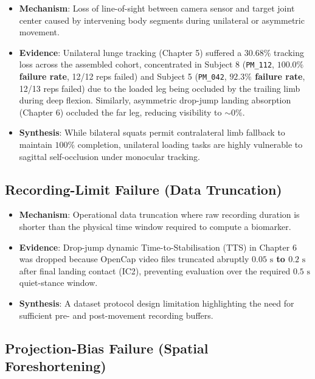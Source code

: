 \begin{itemize}
  \item \textbf{Mechanism}: Loss of line-of-sight between camera sensor and target joint center caused by intervening body segments during unilateral or asymmetric movement.
  \item \textbf{Evidence}: Unilateral lunge tracking (Chapter 5) suffered a $30.68\%$ tracking loss across the assembled cohort, concentrated in Subject 8 (\texttt{PM\_112}, \textbf{$100.0\%$ failure rate}, 12/12 reps failed) and Subject 5 (\texttt{PM\_042}, \textbf{$92.3\%$ failure rate}, 12/13 reps failed) due to the loaded leg being occluded by the trailing limb during deep flexion. Similarly, asymmetric drop-jump landing absorption (Chapter 6) occluded the far leg, reducing visibility to \textbf{$\sim 0\%$}.
  \item \textbf{Synthesis}: While bilateral squats permit contralateral limb fallback to maintain $100\%$ completion, unilateral loading tasks are highly vulnerable to sagittal self-occlusion under monocular tracking.
\end{itemize}

\subsection{Recording-Limit Failure (Data Truncation)}
\label{sec:14-2-2-recording-limit-failure-data-truncation}

\begin{itemize}
  \item \textbf{Mechanism}: Operational data truncation where raw recording duration is shorter than the physical time window required to compute a biomarker.
  \item \textbf{Evidence}: Drop-jump dynamic Time-to-Stabilisation (TTS) in Chapter 6 was dropped because OpenCap video files truncated abruptly \textbf{$0.05\text{ s}$ to $0.2\text{ s}$} after final landing contact (IC2), preventing evaluation over the required $0.5\text{ s}$ quiet-stance window.
  \item \textbf{Synthesis}: A dataset protocol design limitation highlighting the need for sufficient pre- and post-movement recording buffers.
\end{itemize}

\subsection{Projection-Bias Failure (Spatial Foreshortening)}
\label{sec:14-2-3-projection-bias-failure-spatial-foreshortening}

